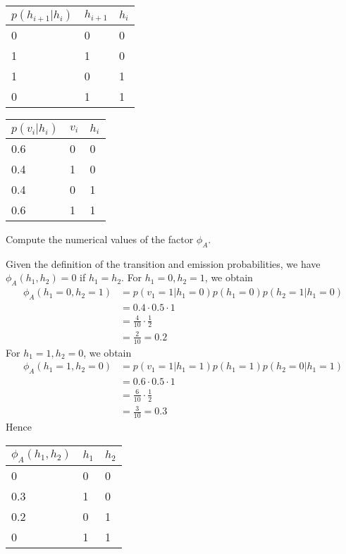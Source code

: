 \begin{exenumerate}
  \begin{center}
    \begin{tabular}{lll}
      \toprule
      $p(h_{i+1}|h_i)$ & $h_{i+1}$ &$h_i$ \\
      \midrule
      0 & 0 & 0\\
      1 & 1 & 0\\
      1 & 0 & 1\\
      0 & 1 & 1\\
      \bottomrule
    \end{tabular}
    \hspace{5ex}
    \begin{tabular}{lll}
      \toprule
      $p(v_i|h_i)$ & $v_i$ &$h_i$ \\
      \midrule
      0.6 & 0 & 0\\
      0.4 & 1 & 0\\
      0.4 & 0 & 1\\
      0.6 & 1 & 1\\
      \bottomrule
    \end{tabular}
  \end{center}
  Compute the numerical values of the factor $\phi_A$.

  \begin{solution}


  \item Given the definition of the transition and emission
    probabilities, we have $\phi_A(h_1,h_2) = 0$ if $h_1=h_2$. For $h_1=0, h_2 =1$, we obtain
    \begin{align}
      \phi_A(h_1=0, h_2=1) &= p(v_1=1 | h_1=0) p(h_1=0) p(h_2=1 | h_1=0) \\
      & = 0.4 \cdot 0.5 \cdot 1\\
      & = \frac{4}{10} \cdot \frac{1}{2}\\
      & = \frac{2}{10} = 0.2
    \end{align}
    For $h_1=1, h_2 =0$, we obtain
    \begin{align}
      \phi_A(h_1=1, h_2=0) &= p(v_1=1 | h_1=1) p(h_1=1) p(h_2=0 | h_1=1) \\
      & = 0.6 \cdot 0.5 \cdot 1\\
      & = \frac{6}{10} \cdot \frac{1}{2}\\
      & = \frac{3}{10} =0.3
    \end{align}
    Hence
     \begin{center}
     \begin{tabular}{lll}
      \toprule
   $\phi_A(h_1, h_2)$ & $h_1$ &$h_2$ \\
      \midrule
      0 & 0 & 0\\
      0.3 & 1 & 0\\
      0.2 & 0 & 1\\
      0 & 1 & 1\\
      \bottomrule
    \end{tabular}
  \end{center}
    

\end{solution}
\end{exenumerate}
